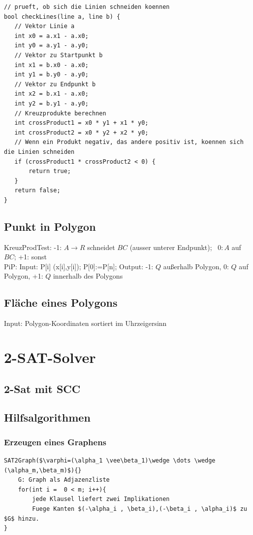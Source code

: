 \documentclass[10pt,a4paper,ngerman,oneside,]{article}
\begin{document}
\begin{multicols}{2}
\begin{lstlisting}
// prueft, ob sich die Linien schneiden koennen
bool checkLines(line a, line b) {
   // Vektor Linie a
   int x0 = a.x1 - a.x0;
   int y0 = a.y1 - a.y0;
   // Vektor zu Startpunkt b
   int x1 = b.x0 - a.x0;
   int y1 = b.y0 - a.y0;
   // Vektor zu Endpunkt b
   int x2 = b.x1 - a.x0;
   int y2 = b.y1 - a.y0;
   // Kreuzprodukte berechnen
   int crossProduct1 = x0 * y1 + x1 * y0;
   int crossProduct2 = x0 * y2 + x2 * y0;
   // Wenn ein Produkt negativ, das andere positiv ist, koennen sich die Linien schneiden
   if (crossProduct1 * crossProduct2 < 0) {
       return true;
   }
   return false;
}		
		\end{lstlisting}
\subsection{Punkt in Polygon}
 KreuzProdTest: -1: $A\to R$ schneidet $BC$ (ausser unterer Endpunkt);~ $0: A$ auf $BC$;  +1: sonst\\
 PiP: Input: P[i] (x[i],y[i]); P[0]:=P[n]; Output: -1: $Q$ außerhalb Polygon, 0: $Q$ auf Polygon, +1: $Q$ innerhalb des Polygons
\subsection{Fläche eines Polygons}
Input: Polygon-Koordinaten sortiert im Uhrzeigersinn
\section{2-SAT-Solver}
\subsection{2-Sat mit SCC}

\subsection{Hilfsalgorithmen}
\subsubsection{Erzeugen eines Graphens}
\begin{lstlisting}[]
SAT2Graph($\varphi=(\alpha_1 \vee\beta_1)\wedge \dots \wedge (\alpha_m,\beta_m)$){}
	G: Graph als Adjazenzliste
	for(int i =  0 < m; i++){
		jede Klausel liefert zwei Implikationen 
		Fuege Kanten $(-\alpha_i , \beta_i),(-\beta_i , \alpha_i)$ zu $G$ hinzu.
}
\end{lstlisting}

\end{multicols}
\end{document}
